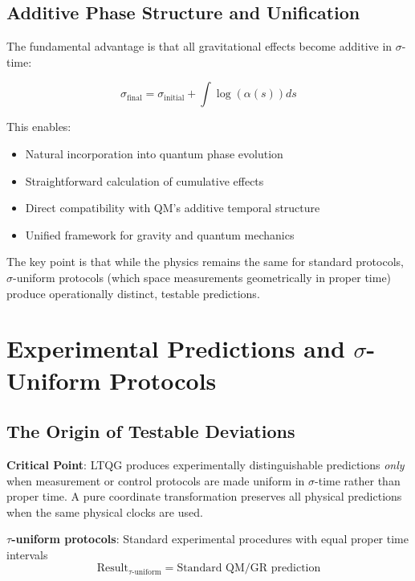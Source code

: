 \documentclass[12pt,a4paper]{article}
\begin{document}
\subsection{Additive Phase Structure and Unification}

The fundamental advantage is that all gravitational effects become additive in $\sigma$-time:

\begin{equation}
\sigma_{\text{final}} = \sigma_{\text{initial}} + \int \log(\alpha(s)) ds
\end{equation}

This enables:
\begin{itemize}
\item Natural incorporation into quantum phase evolution
\item Straightforward calculation of cumulative effects
\item Direct compatibility with QM's additive temporal structure
\item Unified framework for gravity and quantum mechanics
\end{itemize}

The key point is that while the physics remains the same for standard protocols, $\sigma$-uniform protocols (which space measurements geometrically in proper time) produce operationally distinct, testable predictions.

\section{Experimental Predictions and $\sigma$-Uniform Protocols}

\subsection{The Origin of Testable Deviations}

\textbf{Critical Point}: LTQG produces experimentally distinguishable predictions \emph{only} when measurement or control protocols are made uniform in $\sigma$-time rather than proper time. A pure coordinate transformation preserves all physical predictions when the same physical clocks are used.

\textbf{$\tau$-uniform protocols}: Standard experimental procedures with equal proper time intervals
\begin{equation}
\text{Result}_{\tau\text{-uniform}} = \text{Standard QM/GR prediction}
\end{equation}
\end{document}
